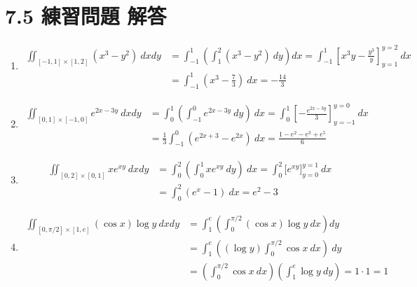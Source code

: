 \documentclass[a4paper,12pt, uplatex, dvipdfmx]{jsarticle}
\begin{document}
\section*{7.5 練習問題 解答}

\begin{enumerate}[(1)]

  \setlength{\itemsep}{2zh}
  
\item
  \[
    \begin{aligned}
      \iint_{[-1,1] \times [1,2]} (x^3-y^2) \ dx dy
      &= \int_{-1}^{1} \left( \int_{1}^{2} (x^3-y^2) \ dy \right) dx
        = \int_{-1}^{1} \left[ x^3y-\frac{y^3}{y} \right]_{y=1}^{y=2} \ dx \\[2ex]
      &= \int_{-1}^{1} \left( x^3-\frac{7}{3} \right) \ dx = -\frac{14}{3}
    \end{aligned}
  \]
  
\item
  \[
    \begin{aligned}
      \iint_{[0,1] \times [-1,0]} e^{2x-3y} \ dx dy
      &= \int_{0}^{1} \left( \int_{-1}^{0} e^{2x-3y} \ dy \right) \ dx
        = \int_{0}^{1} \left[ -\frac{e^{2x-3y}}{3} \right]_{y=-1}^{y=0} \ dx\\[2ex]
      &= \frac{1}{3}\int_{-1}^{0} \left( e^{2x+3} - e^{2x} \right) \ dx
        = \frac{1-e^2 - e^3 + e^5}{6}
    \end{aligned}
  \]

\item
  \[
    \begin{aligned}
      \iint_{[0,2] \times [0,1]} x e^{xy} \ dx dy
      &= \int_{0}^{2} \left( \int_{0}^{1} x e^{xy} \ dy \right) \ dx
        = \int_{0}^{2} \Big[ e^{xy} \Big]_{y=0}^{y=1} \ dx\\[2ex]
      &= \int_{0}^{2} \left( e^x-1\right) \ dx = e^2 -3
    \end{aligned}
  \]

\item
  \[
    \begin{aligned}
      \iint_{[0, \pi/2] \times [1,e]} \left( \cos x \right) \log y \ dx dy
      &= \int_{1}^{e} \left( \int_{0}^{\pi/2} \left( \cos x \right) \log y \ dx \right) dy\\
      &= \int_{1}^{e} \left(\left(\log y\right) \int_{0}^{\pi/2} \cos x \ dx \right) \ dy\\
      &= \left( \int_{0}^{\pi/2} \cos x \ dx\right) \left( \int_{1}^{e} \log y \ dy \right)
        = 1 \cdot 1 = 1
    \end{aligned}
  \]
  

\end{enumerate}
\end{document}
